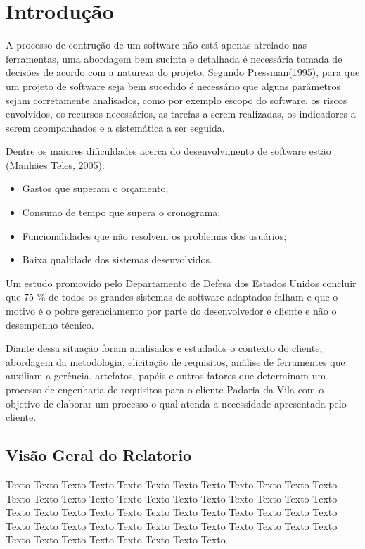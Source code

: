 \chapter{Introdução}

	A processo de contrução de um software não está apenas atrelado nas ferramentas, uma abordagem bem sucinta e detalhada é necessária tomada de decisões de acordo com a natureza do projeto. Segundo Pressman(1995), para que um projeto de software seja bem sucedido é necessário que alguns parâmetros sejam corretamente analisados, como por exemplo escopo do software, os riscos envolvidos, os recursos necessários, as tarefas a serem realizadas, os indicadores a serem acompanhados e a sistemática a ser seguida.

	Dentre os maiores dificuldades acerca do desenvolvimento de software estão (Manhães Teles, 2005):

\begin{itemize}	
	\item Gastos que superam o orçamento;
	\item Consumo de tempo que supera o cronograma;
	\item Funcionalidades que não resolvem os problemas dos usuários;
	\item Baixa qualidade dos sistemas desenvolvidos.
\end{itemize}

	Um estudo promovido pelo Departamento de Defesa dos Estados Unidos concluir que 75 \% de todos os grandes sistemas de software adaptados falham e que o motivo é o pobre gerenciamento por parte do desenvolvedor e cliente e não o desempenho técnico.

	Diante dessa situação foram analisados e estudados o contexto do cliente, abordagem da metodologia, elicitação de requisitos, análise de ferramentes que auxiliam a gerência, artefatos, papéis e outros fatores que determinam um processo de engenharia de requisitos para o cliente Padaria da Vila com o objetivo de elaborar um processo o qual atenda a necessidade apresentada pelo cliente.

\section{Visão Geral do Relatorio}

  Texto Texto Texto Texto Texto Texto Texto Texto Texto Texto Texto Texto Texto Texto
  Texto Texto Texto Texto Texto Texto Texto Texto Texto Texto Texto Texto Texto Texto
  Texto Texto Texto Texto Texto Texto Texto Texto Texto Texto Texto Texto Texto Texto
  Texto Texto Texto Texto Texto Texto Texto Texto Texto Texto Texto Texto Texto Texto

